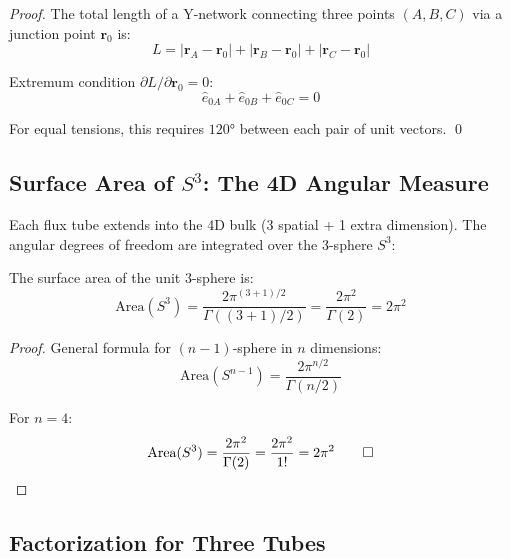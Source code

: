 \begin{proof}
The total length of a Y-network connecting three points $(A, B, C)$ via a junction
point $\mathbf{r}_0$ is:
\begin{equation}
L = |\mathbf{r}_A - \mathbf{r}_0| + |\mathbf{r}_B - \mathbf{r}_0| + |\mathbf{r}_C - \mathbf{r}_0|
\label{eq:ch2_steiner_length}
\end{equation}

Extremum condition $\partial L / \partial \mathbf{r}_0 = 0$:
\begin{equation}
\hat{e}_{0A} + \hat{e}_{0B} + \hat{e}_{0C} = 0
\label{eq:ch2_steiner_condition}
\end{equation}

For equal tensions, this requires $120°$ between each pair of unit vectors. \qed
\end{proof}

\subsection{Surface Area of $S^3$: The 4D Angular Measure}

Each flux tube extends into the 4D bulk (3 spatial + 1 extra dimension). The angular
degrees of freedom are integrated over the 3-sphere $S^3$:

\begin{theorem}[Area of $S^3$]
\label{thm:ch2_area_s3}
\tagM{}
The surface area of the unit 3-sphere is:
\begin{equation}
\text{Area}(S^3) = \frac{2\pi^{(3+1)/2}}{\Gamma((3+1)/2)} = \frac{2\pi^2}{\Gamma(2)} = 2\pi^2
\label{eq:ch2_area_s3}
\end{equation}
\end{theorem}

\begin{proof}
General formula for $(n-1)$-sphere in $n$ dimensions:
\begin{equation}
\text{Area}(S^{n-1}) = \frac{2\pi^{n/2}}{\Gamma(n/2)}
\label{eq:ch2_sphere_area_general}
\end{equation}

For $n=4$:
\begin{equation}
\text{Area}(S^3) = \frac{2\pi^2}{\Gamma(2)} = \frac{2\pi^2}{1!} = 2\pi^2 \qed
\label{eq:ch2_s3_calculation}
\end{equation}
\end{proof}

\subsection{Factorization for Three Tubes}

